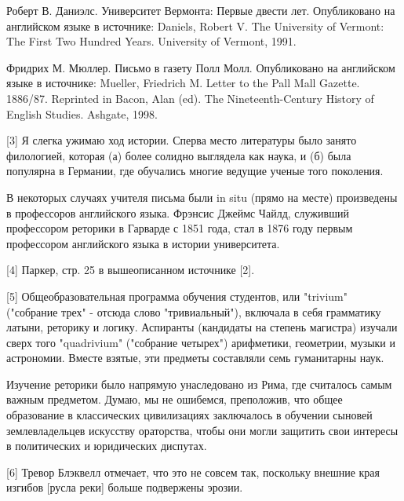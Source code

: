 \documentclass[ebook,12pt,oneside,openany]{memoir}
\begin{document}
Роберт В. Даниэлс. Университет Вермонта: Первые двести лет.
Опубликовано на английском языке в источнике: Daniels, Robert V. The
University of Vermont: The First Two Hundred Years. University of
Vermont, 1991.

Фридрих М. Мюллер. Письмо в газету Полл Молл. Опубликовано на
английском языке в источнике: Mueller, Friedrich M. Letter to the Pall
Mall Gazette. 1886/87. Reprinted in Bacon, Alan (ed). The
Nineteenth-Century History of English Studies. Ashgate, 1998.

[3] Я слегка ужимаю ход истории. Сперва место литературы было занято
филологией, которая (а) более солидно выглядела как наука, и (б) была
популярна в Германии, где обучались многие ведущие ученые того
поколения.

В некоторых случаях учителя письма были in situ (прямо на месте)
произведены в профессоров английского языка. Фрэнсис Джеймс Чайлд,
служивший профессором реторики в Гарварде с 1851 года, стал в 1876
году первым профессором английского языка в истории университета.

[4] Паркер, стр. 25 в вышеописанном источнике [2].

[5] Общеобразовательная программа обучения студентов, или "trivium"
("собрание трех" - отсюда слово "тривиальный"), включала в себя
грамматику латыни, реторику и логику. Аспиранты (кандидаты на степень
магистра) изучали сверх того "quadrivium" ("собрание четырех")
арифметики, геометрии, музыки и астрономии. Вместе взятые, эти
предметы составляли семь гуманитарны наук.

Изучение реторики было напрямую унаследовано из Рима, где считалось
самым важным предметом. Думаю, мы не ошибемся, преположив, что общее
образование в классических цивилизациях заключалось в обучении сыновей
землевладельцев искусству ораторства, чтобы они могли защитить свои
интересы в политических и юридических диспутах.

[6] Тревор Блэквелл отмечает, что это не совсем так, поскольку внешние
края изгибов [русла реки] больше подвержены эрозии.
\end{document}
